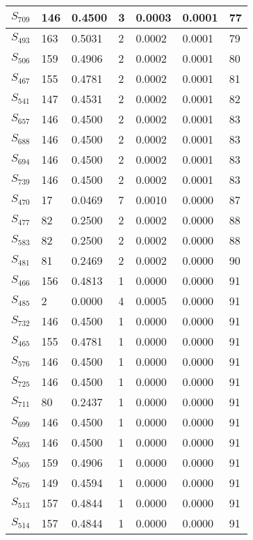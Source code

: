 \begin{xltabular}{\textwidth}{|X|X|X|X|X|X|X|}
 $S_{709}$ & 146 & 0.4500 & 3 & 0.0003 & 0.0001 & 77 \\ \hline
 $S_{493}$ & 163 & 0.5031 & 2 & 0.0002 & 0.0001 & 79 \\ \hline
 $S_{506}$ & 159 & 0.4906 & 2 & 0.0002 & 0.0001 & 80 \\ \hline
 $S_{467}$ & 155 & 0.4781 & 2 & 0.0002 & 0.0001 & 81 \\ \hline
 $S_{541}$ & 147 & 0.4531 & 2 & 0.0002 & 0.0001 & 82 \\ \hline
 $S_{657}$ & 146 & 0.4500 & 2 & 0.0002 & 0.0001 & 83 \\ \hline
 $S_{688}$ & 146 & 0.4500 & 2 & 0.0002 & 0.0001 & 83 \\ \hline
 $S_{694}$ & 146 & 0.4500 & 2 & 0.0002 & 0.0001 & 83 \\ \hline
 $S_{739}$ & 146 & 0.4500 & 2 & 0.0002 & 0.0001 & 83 \\ \hline
 $S_{470}$ & 17 & 0.0469 & 7 & 0.0010 & 0.0000 & 87 \\ \hline
 $S_{477}$ & 82 & 0.2500 & 2 & 0.0002 & 0.0000 & 88 \\ \hline
 $S_{583}$ & 82 & 0.2500 & 2 & 0.0002 & 0.0000 & 88 \\ \hline
 $S_{481}$ & 81 & 0.2469 & 2 & 0.0002 & 0.0000 & 90 \\ \hline
 $S_{466}$ & 156 & 0.4813 & 1 & 0.0000 & 0.0000 & 91 \\ \hline
 $S_{485}$ & 2 & 0.0000 & 4 & 0.0005 & 0.0000 & 91 \\ \hline
 $S_{732}$ & 146 & 0.4500 & 1 & 0.0000 & 0.0000 & 91 \\ \hline
 $S_{465}$ & 155 & 0.4781 & 1 & 0.0000 & 0.0000 & 91 \\ \hline
 $S_{576}$ & 146 & 0.4500 & 1 & 0.0000 & 0.0000 & 91 \\ \hline
 $S_{725}$ & 146 & 0.4500 & 1 & 0.0000 & 0.0000 & 91 \\ \hline
 $S_{711}$ & 80 & 0.2437 & 1 & 0.0000 & 0.0000 & 91 \\ \hline
 $S_{699}$ & 146 & 0.4500 & 1 & 0.0000 & 0.0000 & 91 \\ \hline
 $S_{693}$ & 146 & 0.4500 & 1 & 0.0000 & 0.0000 & 91 \\ \hline
 $S_{505}$ & 159 & 0.4906 & 1 & 0.0000 & 0.0000 & 91 \\ \hline
 $S_{676}$ & 149 & 0.4594 & 1 & 0.0000 & 0.0000 & 91 \\ \hline
 $S_{513}$ & 157 & 0.4844 & 1 & 0.0000 & 0.0000 & 91 \\ \hline
 $S_{514}$ & 157 & 0.4844 & 1 & 0.0000 & 0.0000 & 91 \\ \hline

\end{xltabular}
